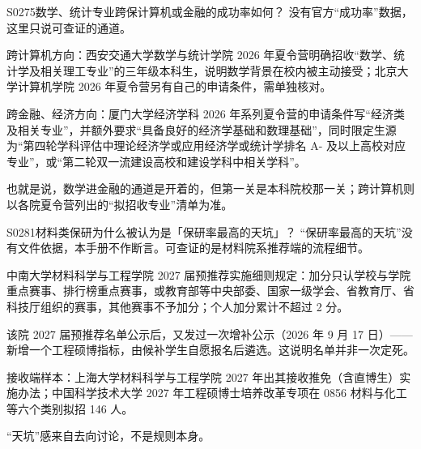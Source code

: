 \begin{qa}{S0275}{数学、统计专业跨保计算机或金融的成功率如何？}
没有官方“成功率”数据，这里只说可查证的通道。

跨计算机方向：西安交通大学数学与统计学院 2026 年夏令营明确招收“数学、统计学及相关理工专业”的三年级本科生，说明数学背景在校内被主动接受；北京大学计算机学院 2026 年夏令营另有自己的申请条件，需单独核对。

跨金融、经济方向：厦门大学经济学科 2026 年系列夏令营的申请条件写“经济类及相关专业”，并额外要求“具备良好的经济学基础和数理基础”，同时限定生源为“第四轮学科评估中理论经济学或应用经济学或统计学排名 A- 及以上高校对应专业”，或“第二轮双一流建设高校和建设学科中相关学科”。

也就是说，数学进金融的通道是开着的，但第一关是本科院校那一关；跨计算机则以各院夏令营列出的“拟招收专业”清单为准。
\end{qa}

\begin{qa}{S0281}{材料类保研为什么被认为是「保研率最高的天坑」？}
“保研率最高的天坑”没有文件依据，本手册不作断言。可查证的是材料院系推荐端的流程细节。

中南大学材料科学与工程学院 2027 届预推荐实施细则规定：加分只认学校与学院重点赛事、排行榜重点赛事，或教育部等中央部委、国家一级学会、省教育厅、省科技厅组织的赛事，其他赛事不予加分；个人加分累计不超过 2 分。

该院 2027 届预推荐名单公示后，又发过一次增补公示（2026 年 9 月 17 日）——新增一个工程硕博指标，由候补学生自愿报名后遴选。这说明名单并非一次定死。

接收端样本：上海大学材料科学与工程学院 2027 年出其接收推免（含直博生）实施办法；中国科学技术大学 2027 年工程硕博士培养改革专项在 0856 材料与化工等六个类别拟招 146 人。

“天坑”感来自去向讨论，不是规则本身。
\end{qa}

